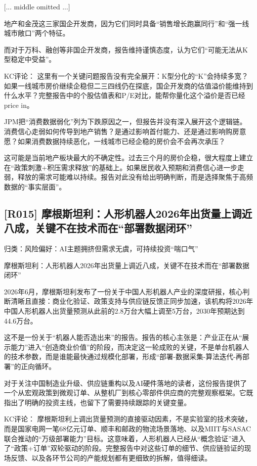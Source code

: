 \documentclass[11pt]{ctexart}
\begin{document}
[... middle omitted ...]

地产和金茂这三家国企开发商，因为它们同时具备“销售增长跑赢同行”和“强一线城市敞口”两个特征。

而对于万科、融创等非国企开发商，报告维持谨慎态度，认为它们“可能无法从K型稳定中受益”。

KC评论： 这里有一个关键问题报告没有完全展开：K型分化的“K”会持续多宽？如果一线城市房价继续企稳但二三四线仍在探底，国企开发商的估值溢价能维持到什么水平？完整报告中的个股估值表和P/E对比，能帮你量化这个溢价是否已经price in。

JPM把“消费数据弱化”列为下跌原因之一，但报告并没有深入展开这个逻辑链。消费信心走弱如何传导到地产销售？是通过影响首付能力、还是通过影响购房意愿？如果消费数据持续恶化，一线城市已经企稳的房价会不会再次承压？

这可能是当前地产板块最大的不确定性。过去三个月的房价企稳，很大程度上建立在“政策刺激+积压需求释放”的基础上。如果居民收入预期和消费信心进一步走弱，释放的需求可能难以持续。报告对此没有给出明确判断，而是选择聚焦于高频数据的“事实层面”。

\subsection{[R015] 摩根斯坦利：人形机器人2026年出货量上调近八成，关键不在技术而在“部署数据闭环”}
{\small\color{refgray}归类：风险偏好：AI主题拥挤但需求无虞，可持续投资“喘口气”}

摩根斯坦利：人形机器人2026年出货量上调近八成，关键不在技术而在“部署数据闭环”

2026年6月，摩根斯坦利发布了一份关于中国人形机器人产业的深度研报，核心判断清晰且直接：商业化验证、政策支持与供应链反馈正同步加速，该机构将2026年中国人形机器人出货量预测从此前的2.8万台大幅上调至5万台，2030年预期达到44.6万台。

这不是一份关于“机器人能否造出来”的报告。报告的核心主张是：产业正在从“展示能力”进入“创造商业价值”的阶段，而决定这一轮成败的关键，不是单台机器人的技术参数，而是谁能最快通过规模化部署，形成“部署-数据采集-算法迭代-再部署”的正向循环。

对于关注中国制造业升级、供应链重构以及AI硬件落地的读者，这份报告提供了一个从宏观政策到微观订单、从整机厂到核心零部件供应商的完整观察框架。它既指出了明确的投资主线，也留下了需要持续跟踪的关键变量。

KC评论： 摩根斯坦利上调出货量预测的直接驱动因素，不是实验室的技术突破，而是国家电网一笔68亿元订单、顺丰和邮政的物流场景落地、以及MIIT与SASAC联合推动的“万级部署能力”目标。这意味着，人形机器人已经从“概念验证”进入了“政策+订单”双轮驱动的阶段。完整报告中对这些订单的细节、供应链验证的现场反馈、以及各环节公司的产能规划都有更细致的拆解，值得细读。
\end{document}
